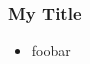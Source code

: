 \begin{frame}
    \frametitle{My Title}
    \begin{itemize}
        \item foobar
    \end{itemize}
\end{frame}
